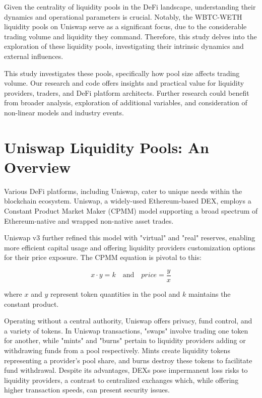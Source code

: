\documentclass{article}
\begin{document}
Given the centrality of liquidity pools in the DeFi landscape, understanding their dynamics and operational parameters is crucial. Notably, the WBTC-WETH liquidity pools on Uniswap serve as a significant focus, due to the considerable trading volume and liquidity they command. Therefore, this study delves into the exploration of these liquidity pools, investigating their intrinsic dynamics and external influences.

This study investigates these pools, specifically how pool size affects trading volume. Our research and code offers insights and practical value for liquidity providers, traders, and DeFi platform architects. Further research could benefit from broader analysis, exploration of additional variables, and consideration of non-linear models and industry events.

\section{\textbf{Uniswap Liquidity Pools: An Overview}}

Various DeFi platforms, including Uniswap, cater to unique needs within the blockchain ecosystem\cite{Xu2023}. Uniswap, a widely-used Ethereum-based DEX, employs a Constant Product Market Maker (CPMM) model supporting a broad spectrum of Ethereum-native and wrapped non-native asset trades\cite{Miori2023, Heimbach2022}.

Uniswap v3 further refined this model with "virtual" and "real" reserves, enabling more efficient capital usage and offering liquidity providers customization options for their price exposure\cite{Elsts2021}. The CPMM equation is pivotal to this:

\[x \cdot y = k \quad \text{and} \quad price = \frac{y}{x}\]

where \(x\) and \(y\) represent token quantities in the pool and \(k\) maintains the constant product\cite{Makarov2022,Miori2023}.

Operating without a central authority, Uniswap offers privacy, fund control, and a variety of tokens\cite{Miori2023}. In Uniswap transactions, "swaps" involve trading one token for another, while "mints" and "burns" pertain to liquidity providers adding or withdrawing funds from a pool respectively. Mints create liquidity tokens representing a provider's pool share, and burns destroy these tokens to facilitate fund withdrawal. Despite its advantages, DEXs pose impermanent loss risks to liquidity providers, a contrast to centralized exchanges which, while offering higher transaction speeds, can present security issues\cite{Aigner2021, Heimbach2022, Makarov2022}.
\end{document}
